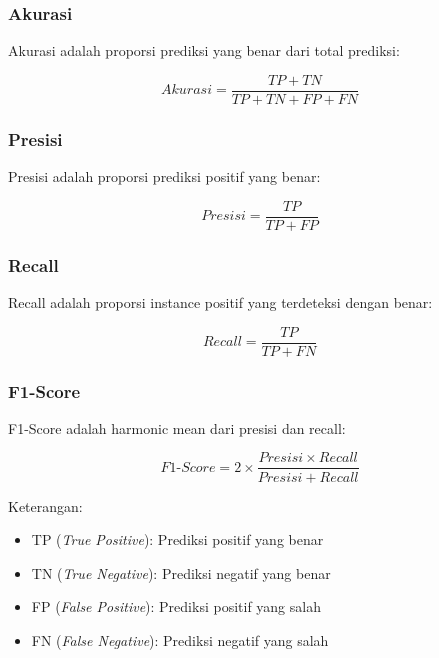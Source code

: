 \subsubsection{Akurasi}

Akurasi adalah proporsi prediksi yang benar dari total prediksi:

\begin{equation}
Akurasi = \frac{TP + TN}{TP + TN + FP + FN}
\end{equation}

\subsubsection{Presisi}

Presisi adalah proporsi prediksi positif yang benar:

\begin{equation}
Presisi = \frac{TP}{TP + FP}
\end{equation}

\subsubsection{Recall}

Recall adalah proporsi instance positif yang terdeteksi dengan benar:

\begin{equation}
Recall = \frac{TP}{TP + FN}
\end{equation}

\subsubsection{F1-Score}

F1-Score adalah harmonic mean dari presisi dan recall:

\begin{equation}
F1\text{-}Score = 2 \times \frac{Presisi \times Recall}{Presisi + Recall}
\end{equation}

Keterangan:
\begin{itemize}
    \item TP (\textit{True Positive}): Prediksi positif yang benar
    \item TN (\textit{True Negative}): Prediksi negatif yang benar
    \item FP (\textit{False Positive}): Prediksi positif yang salah
    \item FN (\textit{False Negative}): Prediksi negatif yang salah
\end{itemize}

